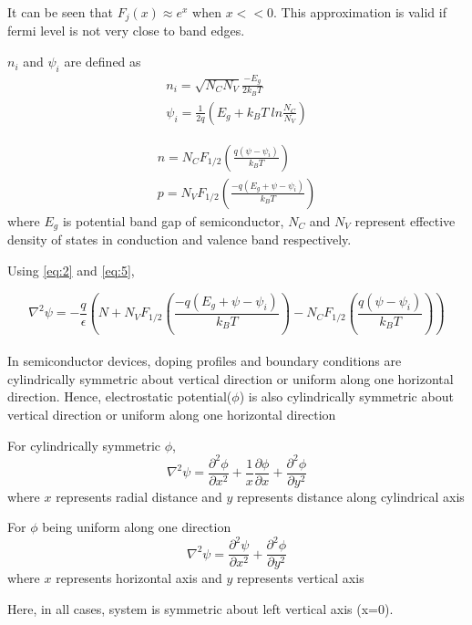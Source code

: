 It can be seen that $F_j(x) \approx e^x$ when $x << 0$. This approximation is valid if fermi level is not very close to band edges.

$n_i$ and $\psi_i$ are defined as
\begin{align*}
 n_i = \sqrt{N_C N_V} \frac{-E_g}{2k_BT}\\
 \psi_i = \frac{1}{2q}(E_g + k_B T\ ln\frac{N_C}{N_V}) \tag{1.4} \label{eq:4}  
\end{align*}

\begin{align*}
n = N_C F_{1/2}\left(\frac{q(\psi-\psi_i)}{k_BT}\right) \\
p = N_V F_{1/2}\left(\frac{-q(E_g+\psi-\psi_i)}{k_BT}\right) \tag{1.5} \label{eq:5}
\end{align*}
where $E_g$ is potential band gap of semiconductor, $N_C$ and $N_V$ represent effective density of states in conduction and valence band respectively. 

Using \eqref{eq:2} and \eqref{eq:5},

\begin{equation}
\nabla^2 \psi = -\frac{q}{\epsilon}(N + N_V F_{1/2}(\frac{-q(E_g+\psi-\psi_i)}{k_BT}) - N_C F_{1/2}(\frac{q(\psi-\psi_i)}{k_BT}))   \tag{1.6} \label{eq:6}
\end{equation}\\

In semiconductor devices, doping profiles and boundary conditions are cylindrically symmetric about vertical direction or uniform along one horizontal direction. Hence, electrostatic potential($\phi$) is also cylindrically symmetric about vertical direction or uniform along one horizontal direction 

For cylindrically symmetric $\phi$,
\begin{equation}
\nabla^2 \psi = \frac{\partial^2\phi}{\partial x^2} + \frac{1}{x}\frac{\partial\phi}{\partial x} + \frac{\partial^2\phi}{\partial y^2}  \tag{1.7} \label{eq:7}
\end{equation}
where $x$ represents radial distance and $y$ represents distance along cylindrical axis

For $\phi$ being uniform along one direction
\begin{equation}
\nabla^2 \psi = \frac{\partial^2\psi}{\partial x^2} + \frac{\partial^2\phi}{\partial y^2}   \tag{1.8} \label{eq:8}
\end{equation}
where $x$ represents horizontal axis and $y$ represents vertical axis

Here, in all cases, system is symmetric about left vertical axis (x=0).

